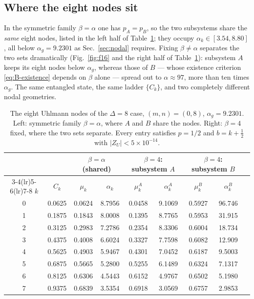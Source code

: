 \documentclass[11pt]{article}
\begin{document}
\subsection{Where the eight nodes sit}

In the symmetric family $\beta=\alpha$ one has $p_A=p_B$, so the two
subsystems share the \emph{same} eight nodes, listed in the left half of
Table~\ref{tab:many}; they occupy $\alpha_k\in[3.54,8.80]$, all below
$\alpha_g=9.2301$ as Sec.~\ref{sec:nodal} requires. Fixing $\beta\neq\alpha$
separates the two sets dramatically (Fig.~\ref{fig:f16} and the right half of
Table~\ref{tab:many}): subsystem $A$ keeps its eight nodes below $\alpha_g$,
whereas those of $B$ --- whose existence criterion \eqref{eq:B-existence}
depends on $\beta$ alone --- spread out to $\alpha\approx97$, more than ten
times $\alpha_g$. The same entangled state, the same ladder $\{C_k\}$, and two
completely different nodal geometries.

\begin{table}[htbp]\centering
\caption{The eight Uhlmann nodes of the $\Delta=8$ case, $(m,n)=(0,8)$,
$\alpha_g=9.2301$. Left: symmetric family $\beta=\alpha$, where $A$ and $B$
share the nodes. Right: $\beta=4$ fixed, where the two sets separate. Every
entry satisfies $p=1/2$ and $b=k+\frac12$ with $|Z_U|<5\times10^{-14}$.}
\label{tab:many}
\begin{tabular}{ccccccccc}
\toprule
& & \multicolumn{2}{c}{$\beta=\alpha$ (shared)}
& \multicolumn{2}{c}{$\beta=4$: subsystem $A$}
& \multicolumn{2}{c}{$\beta=4$: subsystem $B$}\\
\cmidrule(lr){3-4}\cmidrule(lr){5-6}\cmidrule(lr){7-8}
$k$ & $C_k$ & $\mu_k$ & $\alpha_k$ & $\mu_k^A$ & $\alpha_k^A$
& $\mu_k^B$ & $\alpha_k^B$\\
\midrule
0 & 0.0625 & 0.0624 & 8.7956 & 0.0458 & 9.1069 & 0.5927 & 96.746\\
1 & 0.1875 & 0.1843 & 8.0008 & 0.1395 & 8.7765 & 0.5953 & 31.915\\
2 & 0.3125 & 0.2983 & 7.2786 & 0.2354 & 8.3306 & 0.6004 & 18.734\\
3 & 0.4375 & 0.4008 & 6.6024 & 0.3327 & 7.7598 & 0.6082 & 12.909\\
4 & 0.5625 & 0.4903 & 5.9467 & 0.4301 & 7.0452 & 0.6187 & 9.5003\\
5 & 0.6875 & 0.5665 & 5.2800 & 0.5255 & 6.1489 & 0.6324 & 7.1317\\
6 & 0.8125 & 0.6306 & 4.5443 & 0.6152 & 4.9767 & 0.6502 & 5.1980\\
7 & 0.9375 & 0.6839 & 3.5354 & 0.6918 & 3.0569 & 0.6757 & 2.9853\\
\bottomrule
\end{tabular}
\end{table}
\end{document}
